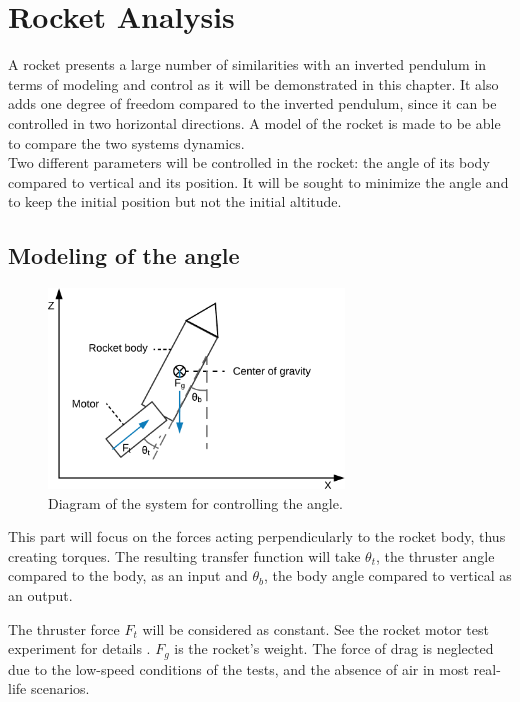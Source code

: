 \chapter{Rocket Analysis}
		A rocket presents a large number of similarities with an inverted pendulum in terms of modeling and control as it will be demonstrated in this chapter. It also adds one degree of freedom compared to the inverted pendulum, since it can be controlled in two horizontal directions. A model of the rocket is made to be able to compare the two systems dynamics.
		\\
		Two different parameters will be controlled in the rocket: the angle of its body compared to vertical and its position.
		It will be sought to minimize the angle and to keep the initial position but not the initial altitude.
		
		\section{Modeling of the angle}
		\begin{figure}[htbp]
			\centering
			\includegraphics[width=0.7\textwidth]{figures/modeling/Rocket/rocket_angle_diagram.png}
			\caption{Diagram of the system for controlling the angle.}
			\label{fig:angle_diagram}
		\end{figure}
		
		This part will focus on the forces acting perpendicularly to the rocket body, thus creating torques.
		The resulting transfer function will take $\theta_t$, the thruster angle compared to the body, as an input and $\theta_b$, the body angle compared to vertical as an output.
		
		The thruster force $F_t$ will be considered as constant. See the rocket motor test experiment for details . $F_g$ is the rocket's weight. The force of drag is neglected due to the low-speed conditions of the tests, and the absence of air in most real-life scenarios.
		
